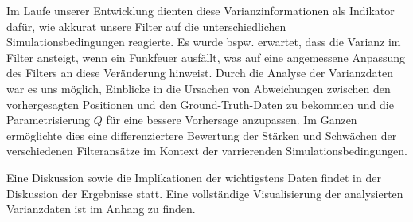 \documentclass[conference]{IEEEtran}[10pt]
\begin{document}
Im Laufe unserer Entwicklung dienten diese Varianzinformationen als Indikator dafür, wie akkurat unsere Filter auf die unterschiedlichen Simulationsbedingungen reagierte. Es wurde bspw. erwartet, dass die Varianz im Filter ansteigt, wenn ein Funkfeuer ausfällt, was auf eine angemessene Anpassung des Filters an diese Veränderung hinweist. Durch die Analyse der Varianzdaten war es uns möglich, Einblicke in die Ursachen von Abweichungen zwischen den vorhergesagten Positionen und den Ground-Truth-Daten zu bekommen und die Parametrisierung \(Q\) 
für eine bessere Vorhersage anzupassen. Im Ganzen ermöglichte dies eine differenziertere Bewertung der Stärken und Schwächen der verschiedenen Filteransätze im Kontext der varrierenden Simulationsbedingungen.

Eine Diskussion sowie die Implikationen der wichtigstens Daten findet in der Diskussion der Ergebnisse statt. Eine vollständige Visualisierung der analysierten Varianzdaten ist im Anhang zu finden.
\end{document}
